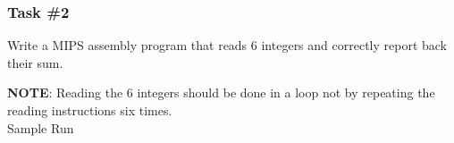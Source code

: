 \documentclass[
	10pt, %
	hmargin=1cm,vmargin=0cm,head=0.5cm,headsep=0pt,foot=0.5cm,margin=2cm
]{beamer}
\begin{document}
\begin{frame}
	\frametitle{Task \#2}
	Write a MIPS assembly program that reads 6 integers and correctly report back their sum. 

	\textbf{NOTE}: Reading the 6 integers should be done in a loop not by repeating the reading instructions six times. \\
	
	\centering
	Sample Run \\ 
\end{frame}

\end{document}
